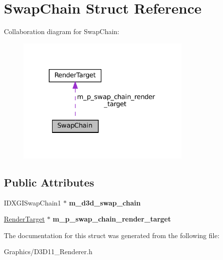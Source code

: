 \hypertarget{structSwapChain}{}\section{Swap\+Chain Struct Reference}
\label{structSwapChain}


Collaboration diagram for Swap\+Chain\+:\nopagebreak
\begin{figure}[H]
\begin{center}
\leavevmode
\includegraphics[width=244pt]{structSwapChain__coll__graph}
\end{center}
\end{figure}
\subsection*{Public Attributes}
\begin{DoxyCompactItemize}
\item 
\mbox{\label{structSwapChain_a1e4a9d0fcd268451355fcea6315115c5}} 
I\+D\+X\+G\+I\+Swap\+Chain1 $\ast$ {\bfseries m\+\_\+d3d\+\_\+swap\+\_\+chain}
\item 
\mbox{\label{structSwapChain_af142fbeb3816afa679981b065b2091d2}} 
\hyperlink{classRenderTarget}{Render\+Target} $\ast$ {\bfseries m\+\_\+p\+\_\+swap\+\_\+chain\+\_\+render\+\_\+target}
\end{DoxyCompactItemize}


The documentation for this struct was generated from the following file\+:\begin{DoxyCompactItemize}
\item 
Graphics/D3\+D11\+\_\+\+Renderer.\+h\end{DoxyCompactItemize}
